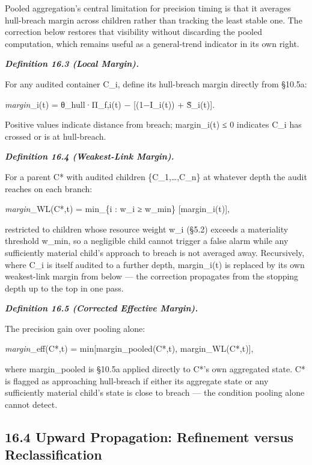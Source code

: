 \documentclass[
]{article}
\begin{document}
Pooled aggregation's central limitation for precision timing is that it
averages hull-breach margin across children rather than tracking the
least stable one. The correction below restores that visibility without
discarding the pooled computation, which remains useful as a
general-trend indicator in its own right.

\emph{\textbf{Definition 16.3 (Local Margin).}}

For any audited container C\_i, define its hull-breach margin directly
from §10.5a:

\emph{margin}\_i(t) = θ\_hull·Π\_f,i(t) − {[}(1−I\_i(t)) + S̃\_i(t){]}.

Positive values indicate distance from breach; margin\_i(t) ≤ 0
indicates C\_i has crossed or is at hull-breach.

\emph{\textbf{Definition 16.4 (Weakest-Link Margin).}}

For a parent C* with audited children \{C\_1,\ldots,C\_n\} at whatever
depth the audit reaches on each branch:

\emph{margin}\_WL(C*,t) = min\_\{i : w\_i ≥ w\_min\} {[}margin\_i(t){]},

restricted to children whose resource weight w\_i (§5.2) exceeds a
materiality threshold w\_min, so a negligible child cannot trigger a
false alarm while any sufficiently material child's approach to breach
is not averaged away. Recursively, where C\_i is itself audited to a
further depth, margin\_i(t) is replaced by its own weakest-link margin
from below --- the correction propagates from the stopping depth up to
the top in one pass.

\emph{\textbf{Definition 16.5 (Corrected Effective Margin).}}

The precision gain over pooling alone:

\emph{margin}\_eff(C*,t) = min{[}margin\_pooled(C*,t),
margin\_WL(C*,t){]},

where margin\_pooled is §10.5a applied directly to C*'s own aggregated
state. C* is flagged as approaching hull-breach if either its aggregate
state or any sufficiently material child's state is close to breach ---
the condition pooling alone cannot detect.

\hypertarget{upward-propagation-refinement-versus-reclassification}{%
\subsection{16.4 Upward Propagation: Refinement versus
Reclassification}\label{upward-propagation-refinement-versus-reclassification}}
\end{document}
